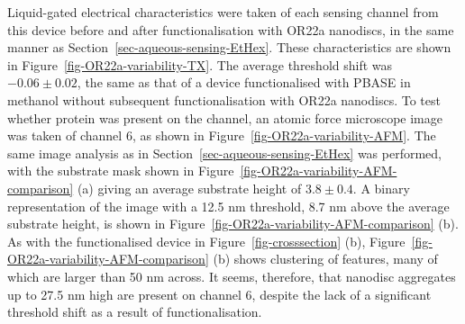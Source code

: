 \documentclass[
  a4paper,
]{scrbook}
\begin{document}
Liquid-gated electrical characteristics were taken of each sensing
channel from this device before and after functionalisation with OR22a
nanodiscs, in the same manner as
Section~\ref{sec-aqueous-sensing-EtHex}. These characteristics are shown
in Figure~\ref{fig-OR22a-variability-TX}. The average threshold shift
was \(-0.06\pm0.02\), the same as that of a device functionalised with
PBASE in methanol without subsequent functionalisation with OR22a
nanodiscs. To test whether protein was present on the channel, an atomic
force microscope image was taken of channel 6, as shown in
Figure~\ref{fig-OR22a-variability-AFM}. The same image analysis as in
Section~\ref{sec-aqueous-sensing-EtHex} was performed, with the
substrate mask shown in
Figure~\ref{fig-OR22a-variability-AFM-comparison} (a) giving an average
substrate height of \(3.8\pm0.4\). A binary representation of the image
with a 12.5 nm threshold, 8.7 nm above the average substrate height, is
shown in Figure~\ref{fig-OR22a-variability-AFM-comparison} (b). As with
the functionalised device in Figure~\ref{fig-crosssection} (b),
Figure~\ref{fig-OR22a-variability-AFM-comparison} (b) shows clustering
of features, many of which are larger than 50 nm across. It seems,
therefore, that nanodisc aggregates up to 27.5 nm high are present on
channel 6, despite the lack of a significant threshold shift as a result
of functionalisation.
\end{document}
